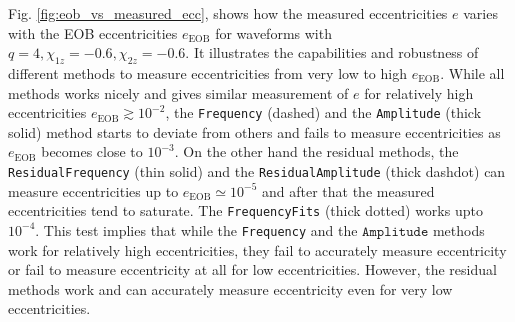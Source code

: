 \documentclass[aps,prd,amsmath,floats,floatfix, twocolumn,
superscriptaddress,nofootinbib,showpacs]{revtex4-1}
\begin{document}
Fig. \ref{fig:eob_vs_measured_ecc}, shows how the measured
eccentricities $e$ varies with the EOB eccentricities $e_{\text{EOB}}$
for waveforms with $q=4, \chi_{1z}=-0.6, \chi_{2z}=-0.6$. It
illustrates the capabilities and robustness of different methods to
measure eccentricities from very low to high $e_{\text{EOB}}$.  While
all methods works nicely and gives similar measurement of $e$ for
relatively high eccentricities $e_{\text{EOB}} \gtrsim 10^{-2}$, the
\texttt{Frequency} (dashed) and the \texttt{Amplitude} (thick solid)
method starts to deviate from others and fails to measure
eccentricities as $e_{\text{EOB}}$ becomes close to $10^{-3}$.  On the
other hand the residual methods, the \texttt{ResidualFrequency} (thin
solid) and the \texttt{ResidualAmplitude} (thick dashdot) can measure
eccentricities up to $e_{\text{EOB}} \simeq 10^{-5}$ and after that
the measured eccentricities tend to saturate. The
\texttt{FrequencyFits} (thick dotted) works upto $10^{-4}$. This test
implies that while the \texttt{Frequency} and the $\texttt{Amplitude}$
methods work for relatively high eccentricities, they fail to
accurately measure eccentricity or fail to measure eccentricity at all
for low eccentricities. However, the residual methods work and can
accurately measure eccentricity even for very low eccentricities.
\end{document}
